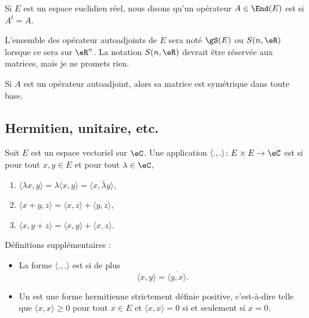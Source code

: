 \begin{definition}	\label{DEFooYAWTooGUpAvw}
	Si \( E\) est un espace euclidien réel, nous disons qu'un opérateur \( A\in \End(E)\) est  si \( A^t=A\).

	L'ensemble des opérateur autoadjoints de \( E\) sera noté \( \gS(E)\) ou \( S(n,\eR)\) lorsque ce sera sur \( \eR^n\). La notation \( S(n,\eR)\) devrait être réservée aux matrices, mais je ne promets rien.
\end{definition}

\begin{lemma}	\label{LEMooECJFooXjrBdX}
	Si \( A\) est un opérateur autoadjoint, alors sa matrice est symétrique dans toute base.
\end{lemma}


\subsection{Hermitien, unitaire, etc.}

\begin{definition}  \label{DefMZQxmQ}
	Soit \( E\) est un espace vectoriel sur \( \eC\). Une application \( \langle ., .\rangle \colon E\times E\to \eC\) est  si pour tout \( x,y\in E\) et pour tout \( \lambda\in \eC\),
	\begin{enumerate}
		\item
		      \( \langle \lambda x, y\rangle =\lambda\langle x,y \rangle =\langle x, \bar\lambda y\rangle \),
		\item
		      \( \langle x+y, z\rangle =\langle x, z\rangle+\langle y, z\rangle  \),
		\item
		      \( \langle x, y+z\rangle =\langle x, y\rangle +\langle x, z\rangle \).
	\end{enumerate}
	Définitions supplémentaires :
	\begin{itemize}
		\item
		      La forme \( \langle ., .\rangle \) est  si de plus
		      \begin{equation}
			      \langle x, y\rangle =\overline{ \langle y, x\rangle  }.
		      \end{equation}
		\item
		      Un  est une forme hermitienne strictement définie positive, c'est-à-dire telle que \( \langle x, x\rangle \geq 0\) pour tout \( x\in E\) et \( \langle x, x\rangle =0\) si et seulement si \( x=0\).
	\end{itemize}
\end{definition}

